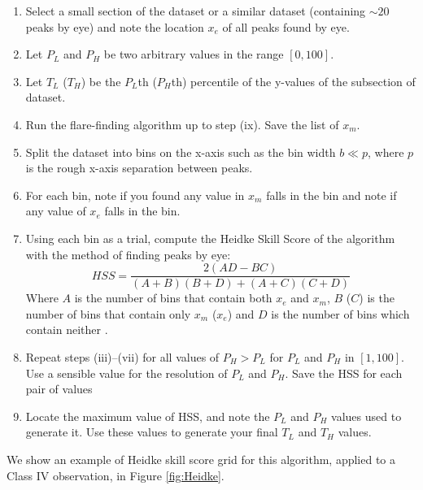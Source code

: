 \begin{enumerate}
  \item Select a small section of the dataset or a similar dataset (containing $\sim20$ peaks by eye) and note the location $x_e$ of all peaks found by eye.
  \item Let $P_L$ and $P_H$ be two arbitrary values in the range $[0,100]$.
  \item Let $T_L$ ($T_H$) be the $P_L$th ($P_H$th) percentile of the y-values of the subsection of dataset.
  \item Run the flare-finding algorithm up to step (ix).  Save the list of $x_m$.
  \item Split the dataset into bins on the x-axis such as the bin width $b\ll p$, where $p$ is the rough x-axis separation between peaks.
  \item For each bin, note if you found any value in $x_m$ falls in the bin and note if any value of $x_e$ falls in the bin.
  \item Using each bin as a trial, compute the Heidke Skill Score \citep{Heidke_SKSC} of the algorithm with the method of finding peaks by eye:
  \begin{equation}HSS = \frac{2(AD-BC)}{(A+B)(B+D)+(A+C)(C+D)}
  \label{eq:HSS}
  \end{equation}
  Where $A$ is the number of bins that contain both $x_e$ and $x_m$, $B$ ($C$) is the number of bins that contain only $x_m$ ($x_e$) and $D$ is the number of bins which contain neither \citep{Kok_YesNo}.
  \item Repeat steps (iii)--(vii) for all values of $P_H>P_L$ for $P_L$ and $P_H$ in $[1,100]$.  Use a sensible value for the resolution of $P_L$ and $P_H$.  Save the HSS for each pair of values
  \item Locate the maximum value of HSS, and note the $P_L$ and $P_H$ values used to generate it.  Use these values to generate your final $T_L$ and $T_H$ values.
\end{enumerate}

We show an example of Heidke skill score grid for this algorithm, applied to a Class IV observation, in Figure \ref{fig:Heidke}.

